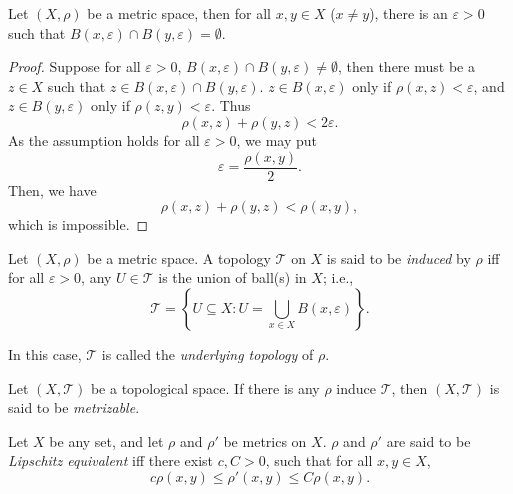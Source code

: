 \begin{proposition}
	\label{prop: metric spaces are Hausdorff}
	Let $(X, \rho)$ be a metric space, then for all $x, y \in X$ ($x \ne y$), there is an $\varepsilon > 0$ such that $B(x, \varepsilon) \cap B (y, \varepsilon) = \emptyset$.
	
	\begin{proof}
		Suppose for all $\varepsilon > 0$, $B(x, \varepsilon) \cap B(y, \varepsilon) \ne \emptyset$, then there must be a $z \in X$ such that $z \in B(x, \varepsilon) \cap B(y, \varepsilon)$. $z \in B(x, \varepsilon)$ only if $\rho(x,z) < \varepsilon$, and $z \in B(y, \varepsilon)$ only if $\rho (z,y) < \varepsilon$. Thus
		$$
		\rho(x, z) + \rho(y,z) < 2\varepsilon.
		$$
		As the assumption holds for all $\varepsilon > 0$, we may put
		$$
		\varepsilon = \frac{\rho(x,y)}{2}.
		$$
		Then, we have
		$$
		\rho(x,z) + \rho(y,z) < \rho(x,y),
		$$
		which is impossible.
	\end{proof}
\end{proposition}


\begin{definition}
	\label{def: induced topologies}
	Let $(X, \rho)$ be a metric space. A topology $\mathcal T$ on $X$ is said to be \textit{induced} by $\rho$ iff for all $\varepsilon > 0$, any $U \in \mathcal T$ is the union of ball(s) in $X$; i.e.,
	$$
	\mathcal T = \left\{ U \subseteq X :  U = \bigcup_{x \in X} B(x, \varepsilon) \right\}.
	$$
	
	In this case, $\mathcal T$ is called the \textit{underlying topology} of $\rho$.
\end{definition}


\begin{definition}
	\label{def: metrizable spaces}
	Let $(X, \mathcal T)$ be a topological space. If there is any $\rho$ induce $\mathcal T$, then $(X, \mathcal T)$ is said to be \textit{metrizable}.
\end{definition}


\begin{definition}
	\label{def: Lipschitz equivalence}
	Let $X$ be any set, and let $\rho$ and $\rho'$ be metrics on $X$. $\rho$ and $\rho'$ are said to be \textit{Lipschitz equivalent} iff there exist $c, C > 0$, such that for all $x,y \in X$,
	$$
	c \rho(x,y) \le \rho'(x,y) \le C \rho(x,y).
	$$
\end{definition}


